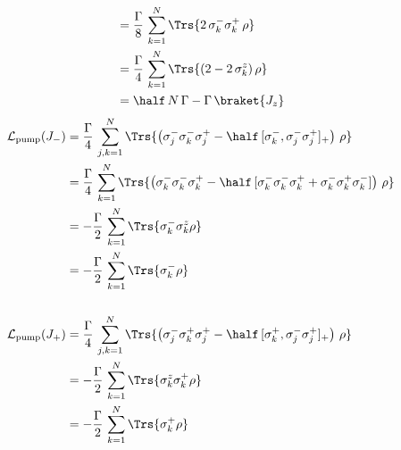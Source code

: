 \begin{appendices}
\begin{align*}
        &=\frac{\Gamma}{8}\,\sum_{k=1}^N \Trs{2\, \sigma_k^-\sigma_k^+  \,\rho}\\
        &=\frac{\Gamma}{4}\,\sum_{k=1}^N \Trs{ (2-2\,\sigma_k^z)  \,\rho}\\
        &=\half\,N\,\Gamma-\Gamma\,\braket{J_z}
    \end{align*}
    \begin{align*}
        \mathcal{L}_\text{pump}(J_-)&=\frac{\Gamma}{4}\,\sum_{j,k=1}^N \Trs{\left( \sigma_j^- \sigma_k^- \sigma_j^+ -\half\,[\sigma_k^-,\sigma_j^-\sigma_j^+]_+   \right)\,\rho}\\
        &=\frac{\Gamma}{4}\,\sum_{k=1}^N \Trs{\left( \sigma_k^- \sigma_k^- \sigma_k^+ -\half\,[\sigma_k^-\sigma_k^-\sigma_k^++\sigma_k^-\sigma_k^+\sigma_k^-]   \right)\,\rho}\\
        &=-\frac{\Gamma}{2}\,\sum_{k=1}^N\Trs{\sigma_k^-\sigma_k^z\rho}\\
        &=-\frac{\Gamma}{2}\,\sum_{k=1}^N\Trs{\sigma_k^-\rho}\\\\
        \mathcal{L}_\text{pump}(J_+)&=\frac{\Gamma}{4}\,\sum_{j,k=1}^N \Trs{\left( \sigma_j^- \sigma_k^+ \sigma_j^+ -\half\,[\sigma_k^+,\sigma_j^-\sigma_j^+]_+   \right)\,\rho}\\
        &=-\frac{\Gamma}{2}\,\sum_{k=1}^N\Trs{\sigma_k^z\sigma_k^+\rho}\\
        &=-\frac{\Gamma}{2}\,\sum_{k=1}^N\Trs{\sigma_k^+\rho}
    \end{align*}
    

\end{appendices}
